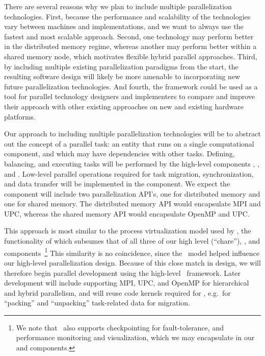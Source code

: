 \documentclass{article}
\begin{document}
There are several reasons why we plan to include multiple
parallelization technologies.  First, because the performance and
scalability of the technologies vary between machines and
implementations, and we want to always use the fastest and most
scalable approach.  Second, one technology may perform better in the
distributed memory regime, whereas another may perform better within a
shared memory node, which motivates flexible hybrid parallel
approaches.  Third, by including multiple existing parallelization
paradigms from the start, the resulting software design will likely be
more amenable to incorporating new future parallelization
technologies.  And fourth, the framework could be used as a tool for
parallel technology designers and implementers to compare and improve
their approach with other existing approaches on new and existing
hardware platforms.

Our approach to including multiple parallelization technologies will
be to abstract out the concept of a parallel task: an entity that runs
on a single computational component, and which may have dependencies
with other tasks.  Defining, balancing, and executing tasks will be
performed by the high-level components , ,
and .  Low-level parallel operations required for task
migration, synchronization, and data transfer will be implemented in
the  component.  We expect the component will include
two parallelization API's, one for distributed memory and one for
shared memory.  The distributed memory API would encapsulate MPI and
UPC, whereas the shared memory API would encapsulate OpenMP and UPC.

This approach is most similar to the process virtualization model used
by \charm, the functionality of which subsumes that of all three of
our high level  (``chare''), , and
 components~\footnote{We note that \charm\ also
  supports checkpointing for fault-tolerance, and performance
  monitoring and visualization, which we may encapsulate in our
   and  components.}  This similarity is
no coincidence, since the \charm\ model helped influence our
high-level parallelization design.  Because of this close match in
design, we will therefore begin parallel development using the
high-level \charm\ framework.  Later development will include
supporting MPI, UPC, and OpenMP for hierarchical and hybrid
parallelism, and will reuse code kernels required for \charm, e.g.~for
``packing'' and ``unpacking'' task-related data for migration.
\end{document}
